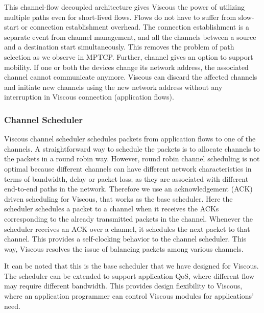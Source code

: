 This channel-flow decoupled architecture gives Viscous the power of utilizing multiple paths even for short-lived flows. Flows do not have to suffer from slow-start or connection establishment overhead. The connection establishment is a separate event from channel management, and all the channels between a source and a destination start simultaneously. This removes the problem of path selection as we observe in MPTCP.  Further, channel gives an option to support mobility. If one or both the devices change its network address, the associated channel cannot communicate anymore. Viscous can discard the affected channels and initiate new channels using the new network address without any interruption in Viscous connection (application flows). 


\subsubsection{Channel Scheduler}
Viscous channel scheduler schedules packets from application flows to one of the channels. A straightforward way  to schedule the packets is to allocate channels to the packets in a round robin way. However, round robin channel scheduling is not optimal because different channels can have different network characteristics in terms of bandwidth, delay or packet loss; as they are associated with different end-to-end paths in the network. Therefore we use an acknowledgement (ACK) driven scheduling for Viscous, that works as the base scheduler. Here the scheduler schedules a packet to a channel when it receives the ACKs corresponding to the already transmitted packets in the channel. Whenever the scheduler receives an ACK over a channel, it schedules the next packet to that channel. This provides a self-clocking behavior to the channel scheduler. This way, Viscous resolves the issue of balancing packets among various channels.

It can be noted that this is the base scheduler that we have designed for Viscous. The scheduler can be extended to support application QoS, where different flow may require different bandwidth. This provides design flexibility to Viscous, where an application programmer can control Viscous modules for applications' need.  


